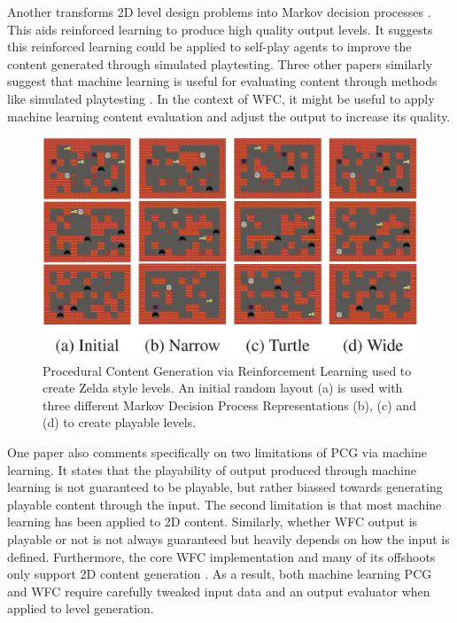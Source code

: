 Another transforms 2D level design problems into Markov decision processes \cite{Markov_PCGRL}. This aids reinforced learning to produce high quality output levels. It suggests this reinforced learning could be applied to self-play agents to improve the content generated through simulated playtesting. Three other papers similarly suggest that machine learning is useful for evaluating content through methods like simulated playtesting \cite{DeepLearningPCG, VGDL_ASP, PCGML}. In the context of WFC, it might be useful to apply machine learning content evaluation and adjust the output to increase its quality.

\begin{figure}[H]
    \centering
    \includegraphics[width=\textwidth, height=0.3\textheight, keepaspectratio]{Images/PCGRL.jpg}
    \caption{Procedural Content Generation via Reinforcement Learning used to create Zelda style levels. An initial random layout (a) is used with three different Markov Decision Process Representations (b), (c) and (d) to create playable levels. \cite{Markov_PCGRL}}
    \label{fig:pcgrl}
\end{figure}

One paper \cite{PCGML} also comments specifically on two limitations of PCG via machine learning. It states that the playability of output produced through machine learning is not guaranteed to be playable, but rather biassed towards generating playable content through the input. The second limitation is that most machine learning has been applied to 2D content. Similarly, whether WFC output is playable or not is not always guaranteed but heavily depends on how the input is defined. Furthermore, the core WFC implementation and many of its offshoots only support 2D content generation \cite{Gumin_Wave_Function_Collapse_2016}. As a result, both machine learning PCG and WFC require carefully tweaked input data and an output evaluator when applied to level generation.

